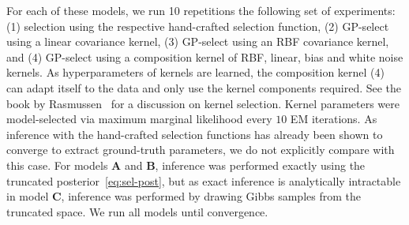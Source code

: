 For each of these models, we run 10 repetitions the following set of experiments: (1) selection using the respective hand-crafted selection function,
(2) GP-select using a linear covariance kernel, (3) GP-select using an RBF covariance kernel, and (4) GP-select using a composition kernel of RBF, linear, bias and white noise kernels.
As hyperparameters of kernels are learned, the composition kernel (4) can adapt itself to the data and only use the kernel components required. 
See the book by Rasmussen~\citep{RasmussenGPbook} for a discussion on kernel selection.
Kernel parameters were model-selected via maximum marginal likelihood every $10$ EM iterations.
As inference with the hand-crafted selection functions has already been shown to converge to extract ground-truth parameters, we do not explicitly compare with this case.
For models \textbf{A} and \textbf{B}, inference was performed exactly using the truncated posterior~\eqref{eq:sel-post}, but as exact inference is analytically intractable in model \textbf{C}, inference was performed by drawing Gibbs samples from the truncated space.
%
We run all models until convergence. %

